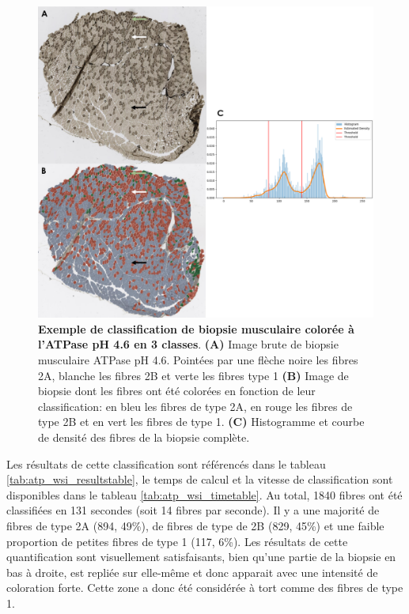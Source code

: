 \begin{figure}[htbp]
 \centering
 \includegraphics[width=1\textwidth]{figures/atp_wsi.png}
 \caption[Exemple de classification de biopsie musculaire colorée à l'ATPase]{\textbf{Exemple de classification de biopsie musculaire colorée à l'ATPase pH 4.6 en 3 classes}. \textbf{(A)} Image brute de biopsie musculaire ATPase pH 4.6. Pointées par une flèche noire les fibres 2A, blanche les fibres 2B et verte les fibres type 1 \textbf{(B)} Image de biopsie dont les fibres ont été colorées en fonction de leur classification: en bleu les fibres de type 2A, en rouge les fibres de type 2B et en vert les fibres de type 1. \textbf{(C)} Histogramme et courbe de densité des fibres de la biopsie complète.}
 \label{fig:atp_paint_wsi}
\end{figure}

Les résultats de cette classification sont référencés dans le tableau \ref{tab:atp_wsi_resultstable}, le temps de calcul et la vitesse de classification sont disponibles dans le tableau \ref{tab:atp_wsi_timetable}. Au total, 1840 fibres ont été classifiées en 131 secondes (soit 14 fibres par seconde). Il y a une majorité de fibres de type 2A (894, 49\%), de fibres de type de 2B (829, 45\%) et une faible proportion de petites fibres de type 1 (117, 6\%). Les résultats de cette quantification sont visuellement satisfaisants, bien qu'une partie de la biopsie en bas à droite, est repliée sur elle-même et donc apparait avec une intensité de coloration forte. Cette zone a donc été considérée à tort comme des fibres de type 1. 

